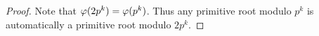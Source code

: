 \begin{proof}
%
%

 Note that $\varphi(2p^k)=\varphi(p^k)$. Thus any primitive root modulo $p^k$ is automatically a primitive root modulo $2p^k$.
\end{proof}
